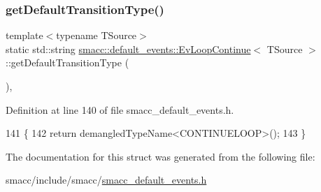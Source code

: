 \subsubsection{\texorpdfstring{get\+Default\+Transition\+Type()}{getDefaultTransitionType()}}
{\footnotesize\ttfamily template$<$typename T\+Source$>$ \\
static std\+::string \hyperlink{structsmacc_1_1default__events_1_1EvLoopContinue}{smacc\+::default\+\_\+events\+::\+Ev\+Loop\+Continue}$<$ T\+Source $>$\+::get\+Default\+Transition\+Type (\begin{DoxyParamCaption}{ }\end{DoxyParamCaption})\hspace{0.3cm}{\ttfamily [inline]}, {\ttfamily [static]}}



Definition at line 140 of file smacc\+\_\+default\+\_\+events.\+h.


\begin{DoxyCode}
141   \{
142     \textcolor{keywordflow}{return} demangledTypeName<CONTINUELOOP>();
143   \}
\end{DoxyCode}


The documentation for this struct was generated from the following file\+:\begin{DoxyCompactItemize}
\item 
smacc/include/smacc/\hyperlink{smacc__default__events_8h}{smacc\+\_\+default\+\_\+events.\+h}\end{DoxyCompactItemize}
